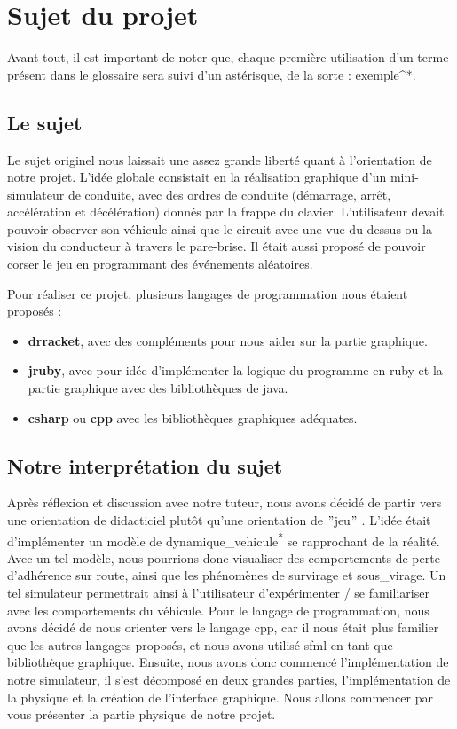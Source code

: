 \usepackage{glossaries}\section{Sujet du projet}\label{sec:sujet-du-projet}
Avant tout, il est important de noter que, chaque première utilisation d'un terme présent dans le glossaire sera suivi d'un astérisque, de la sorte : exemple^{*}.
\subsection{Le sujet}\label{subsec:le-sujet}
Le sujet originel nous laissait une assez grande liberté quant à l'orientation de notre projet.
L'idée globale consistait en la réalisation graphique d'un mini-simulateur de conduite, avec des ordres de conduite (démarrage, arrêt, accélération et décélération) donnés par la frappe du clavier.
L'utilisateur devait pouvoir observer son véhicule ainsi que le circuit avec une vue du dessus ou la vision du conducteur à travers le pare-brise.
Il était aussi proposé de pouvoir \og corser\fg{} le jeu en programmant des événements aléatoires.

Pour réaliser ce projet, plusieurs langages de programmation nous étaient proposés :
\begin{itemize}
    \item \textbf{\gls{drracket}}, avec des compléments pour nous aider sur la partie graphique.
    \item \textbf{\gls{jruby}}, avec pour idée d'implémenter la logique du programme en \gls{ruby} et la partie graphique avec des bibliothèques de \gls{java}.
    \item \textbf{\gls{csharp}} ou \textbf{\gls{cpp}} avec les bibliothèques graphiques adéquates.
\end{itemize}


\subsection{Notre interprétation du sujet}\label{subsec:notre-interpretation-du-sujet-/-objectif-du-sujet}
Après réflexion et discussion avec notre tuteur, nous avons décidé de partir vers une orientation de didacticiel plutôt qu'une \og orientation de \("\)jeu\("\) \fg{}.
L'idée était d'implémenter un modèle de \gls{dynamique_vehicule}\textsuperscript{*} se rapprochant de la réalité.
Avec un tel modèle, nous pourrions donc visualiser des comportements de perte d'adhérence sur route, ainsi que les phénomènes de \gls{survirage} et \gls{sous_virage}.
Un tel simulateur permettrait ainsi à l'utilisateur d'expérimenter / se familiariser avec les comportements du véhicule.
Pour le langage de programmation, nous avons décidé de nous orienter vers le langage \gls{cpp}, car il nous était plus familier que les autres langages proposés, et nous avons utilisé \gls{sfml} en tant que bibliothèque graphique.
Ensuite, nous avons donc commencé l'implémentation de notre simulateur, il s'est décomposé en deux grandes parties, l'implémentation de la physique et la création de l'interface graphique.
Nous allons commencer par vous présenter la partie physique de notre projet.

\newpage